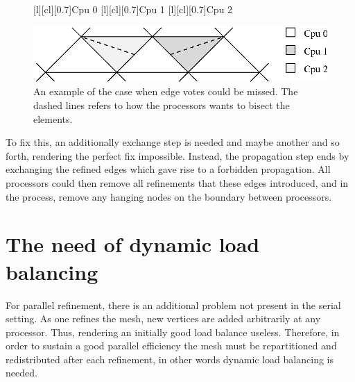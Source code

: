 \begin{figure}[htb]
 [l][cl][0.7]{Cpu 0}
 [l][cl][0.7]{Cpu 1}
 [l][cl][0.7]{Cpu 2}
  \begin{center}
   \includegraphics[width=0.65\columnwidth]{chapters/hoffman-4/eps/probmissing.eps}
  \end{center}
   \caption{An example of the case when edge votes could be missed. The dashed lines refers to how the processors wants to bisect the elements.}
   \label{fig:probmissing}

\end{figure}

To fix this, an additionally exchange step is needed and maybe another
and so forth, rendering the perfect fix impossible. Instead, the
propagation step ends by exchanging the refined edges which gave rise
to a forbidden propagation. All processors could then remove all
refinements that these edges introduced, and in the process, remove
any hanging nodes on the boundary between processors.

\section{The need of dynamic load balancing}

For parallel refinement, there is an additional problem not present in
the serial setting. As one refines the mesh, new vertices are added
arbitrarily at any processor. Thus, rendering an initially good load
balance useless. Therefore, in order to sustain a good parallel
efficiency the mesh must be repartitioned and redistributed after each
refinement, in other words dynamic load balancing is needed.

